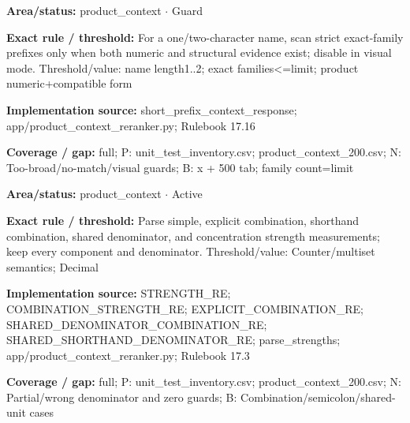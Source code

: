 \begin{tcolorbox}[enhanced,breakable,colback=white,colframe=Muted!45,boxrule=0.45pt,arc=1.5pt,left=6pt,right=6pt,top=5pt,bottom=5pt,title={\texttt{PC-SHORT-PREFIX-25}},title after break={\texttt{PC-SHORT-PREFIX-25}\ (continued)},fonttitle=\headingfont\bfseries\color{Navy},coltitle=Navy]
\textbf{Area/status:} product\_\allowbreak{}context $\boldsymbol{\cdot}$ Guard\par
\smallskip
\textbf{Exact rule / threshold:} For a one/\allowbreak{}two-character name, scan strict exact-family prefixes only when both numeric and structural evidence exist; disable in visual mode. Threshold/\allowbreak{}value: name length1..2; exact families<=limit; product numeric+compatible form\par
\smallskip
\textbf{Implementation source:} short\_\allowbreak{}prefix\_\allowbreak{}context\_\allowbreak{}response; app/\allowbreak{}product\_\allowbreak{}context\_\allowbreak{}reranker.py; Rulebook 17.16\par
\smallskip
\textbf{Coverage / gap:} full; P: unit\_\allowbreak{}test\_\allowbreak{}inventory.csv; product\_\allowbreak{}context\_\allowbreak{}200.csv; N: Too-broad/\allowbreak{}no-match/\allowbreak{}visual guards; B: x + 500 tab; family count=limit
\end{tcolorbox}
\begin{tcolorbox}[enhanced,breakable,colback=white,colframe=Muted!45,boxrule=0.45pt,arc=1.5pt,left=6pt,right=6pt,top=5pt,bottom=5pt,title={\texttt{PC-STRENGTH-PARSE-03}},title after break={\texttt{PC-STRENGTH-PARSE-03}\ (continued)},fonttitle=\headingfont\bfseries\color{Navy},coltitle=Navy]
\textbf{Area/status:} product\_\allowbreak{}context $\boldsymbol{\cdot}$ Active\par
\smallskip
\textbf{Exact rule / threshold:} Parse simple, explicit combination, shorthand combination, shared denominator, and concentration strength measurements; keep every component and denominator. Threshold/\allowbreak{}value: Counter/\allowbreak{}multiset semantics; Decimal\par
\smallskip
\textbf{Implementation source:} STRENGTH\_\allowbreak{}RE; COMBINATION\_\allowbreak{}STRENGTH\_\allowbreak{}RE; EXPLICIT\_\allowbreak{}COMBINATION\_\allowbreak{}RE; SHARED\_\allowbreak{}DENOMINATOR\_\allowbreak{}COMBINATION\_\allowbreak{}RE; SHARED\_\allowbreak{}SHORTHAND\_\allowbreak{}DENOMINATOR\_\allowbreak{}RE; parse\_\allowbreak{}strengths; app/\allowbreak{}product\_\allowbreak{}context\_\allowbreak{}reranker.py; Rulebook 17.3\par
\smallskip
\textbf{Coverage / gap:} full; P: unit\_\allowbreak{}test\_\allowbreak{}inventory.csv; product\_\allowbreak{}context\_\allowbreak{}200.csv; N: Partial/\allowbreak{}wrong denominator and zero guards; B: Combination/\allowbreak{}semicolon/\allowbreak{}shared-unit cases
\end{tcolorbox}
